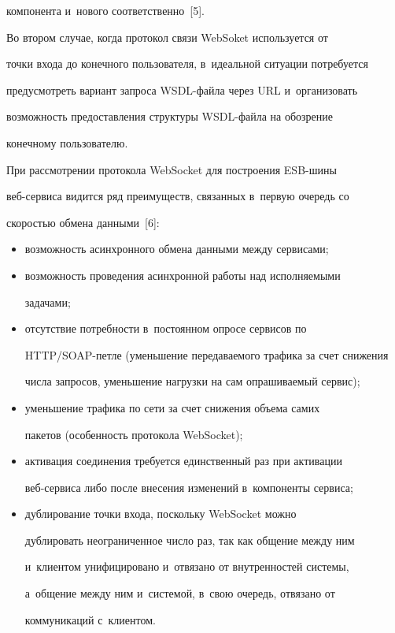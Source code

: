 компонента и~нового соответственно~[5]. 


     


     Во втором случае, когда протокол связи WebSoket используется от 


точки входа до конечного пользователя, в~идеальной ситуации потребуется 


предусмотреть вариант запроса WSDL-фай\-ла через URL и~организовать 


возможность предоставления структуры WSDL-фай\-ла на обозрение 


конечному пользователю.


     


     При рассмотрении протокола WebSocket для построения ESB-ши\-ны 


веб-сер\-ви\-са видится ряд преимуществ, связанных в~первую очередь со 


скоростью обмена данными~[6]: 


     \begin{itemize}


     \item возможность асинхронного обмена данными между сервисами;


     \item возможность проведения асинхронной работы над исполняемыми 


задачами; 


     \item отсутствие потребности в~постоянном опросе сервисов по 


HTTP/SOAP-пет\-ле (уменьшение передаваемого трафика за счет снижения 


числа запросов, уменьшение нагрузки на сам опрашиваемый сервис);


     \item уменьшение трафика по сети за счет снижения объема самих 


пакетов (особенность протокола WebSocket);


     \item активация соединения требуется единственный раз при активации 


веб-сер\-ви\-са либо после внесения изменений в~компоненты сервиса;


     \item дублирование точки входа, поскольку WebSocket можно 


дублировать неограниченное число раз, так как общение между ним 


и~клиентом унифицировано и~отвязано от внутренностей системы, 


а~общение между ним и~системой, в~свою очередь, отвязано от 


коммуникаций с~клиентом.


     \end{itemize}


